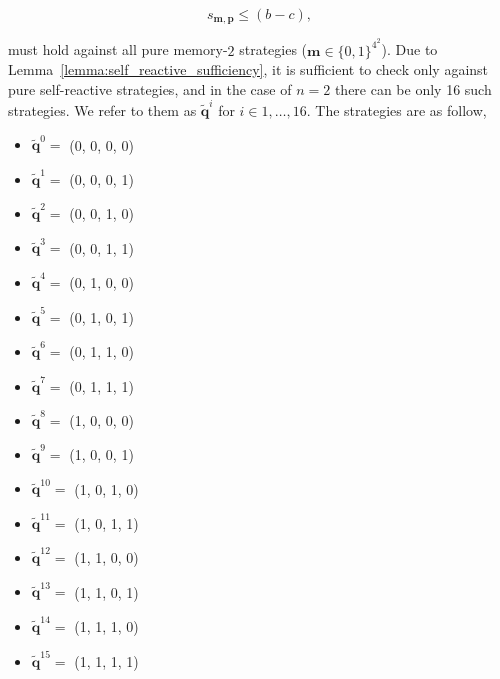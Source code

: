 \documentclass{article}
\theoremstyle{definition}
\begin{document}
\begin{equation}\label{Eq:NashReactive}
  s_{\mathbf{m}, \mathbf{p}} \leq (b - c),
\end{equation}

must hold against all pure memory-\(2\) strategies (\(\mathbf{m} \in \{0, 1\}^{4
^ 2}\)). Due to Lemma~\ref{lemma:self_reactive_sufficiency}, it is sufficient to
check only against pure self-reactive strategies, and in the case of $n=2$ there
can be only 16 such strategies. We refer to them as $\mathbf{\tilde{q}}^{i}$ for
$i \in 1, \dots, 16$. The strategies are as follow,

\begin{multicols}{4}
  \begin{itemize}
    \item $\mathbf{\tilde{q}}^{0} =$ (0, 0, 0, 0)
    \item $\mathbf{\tilde{q}}^{1} =$ (0, 0, 0, 1)
    \item $\mathbf{\tilde{q}}^{2} =$ (0, 0, 1, 0)
    \item $\mathbf{\tilde{q}}^{3} =$ (0, 0, 1, 1)
    \item $\mathbf{\tilde{q}}^{4} =$ (0, 1, 0, 0)
    \item $\mathbf{\tilde{q}}^{5} =$ (0, 1, 0, 1)
    \item $\mathbf{\tilde{q}}^{6} =$ (0, 1, 1, 0)
    \item $\mathbf{\tilde{q}}^{7} =$ (0, 1, 1, 1)
    \item $\mathbf{\tilde{q}}^{8} =$ (1, 0, 0, 0)
    \item $\mathbf{\tilde{q}}^{9} =$ (1, 0, 0, 1)
    \item $\mathbf{\tilde{q}}^{10} =$ (1, 0, 1, 0)
    \item $\mathbf{\tilde{q}}^{11} =$ (1, 0, 1, 1)
    \item $\mathbf{\tilde{q}}^{12} =$ (1, 1, 0, 0)
    \item $\mathbf{\tilde{q}}^{13} =$ (1, 1, 0, 1)
    \item $\mathbf{\tilde{q}}^{14} =$ (1, 1, 1, 0)
    \item $\mathbf{\tilde{q}}^{15} =$ (1, 1, 1, 1)
  \end{itemize}
\end{multicols}
\end{document}
